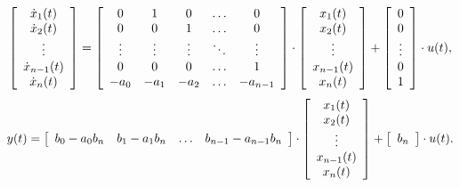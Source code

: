   \begin{equation*}
    \left [ 
    \begin{array}{c}
      \dot{x}_1(t)\\
      \dot{x}_2(t)\\
      \vdots\\
      \dot{x}_{n-1}(t)\\
      \dot{x}_{n}(t)\\
    \end{array}
    \right ] =
    \left [ 
    \begin{array}{c c c c c}
      0 & 1 & 0 & \ldots & 0\\
      0 & 0 & 1 & \ldots & 0\\
      \vdots & \vdots & \vdots & \ddots & \vdots\\
      0 & 0 & 0 & \ldots & 1\\
      -a_0 & -a_1 & -a_2 & \ldots & -a_{n-1}\\
    \end{array}
    \right ]\cdot
    \left [ 
    \begin{array}{c}
      x_1(t)\\
      x_2(t)\\
      \vdots \\
      x_{n-1}(t)\\
      x_{n}(t)\\
    \end{array}
    \right ]+
    \left [ 
    \begin{array}{c}
      0 \\
      0\\
      \vdots\\
      0\\
      1\\
    \end{array}
    \right ]\cdot
    u(t),
  \end{equation*}
  \begin{equation*}
    y(t) = 
    \left [ 
    \begin{array}{c c c c}
      b_0-a_0b_n & b_1-a_1b_n & \ldots & b_{n-1}-a_{n-1}b_n\\
    \end{array}
    \right ] \cdot
    \left [ 
    \begin{array}{c}
      x_1(t)\\
      x_2(t)\\
      \vdots \\
      x_{n-1}(t)\\
      x_{n}(t)\\
    \end{array}
    \right ]+
    \left [ 
    \begin{array}{c}
      b_n \\
    \end{array}
    \right ] \cdot
    u(t).
  \end{equation*}
  \normalsize

